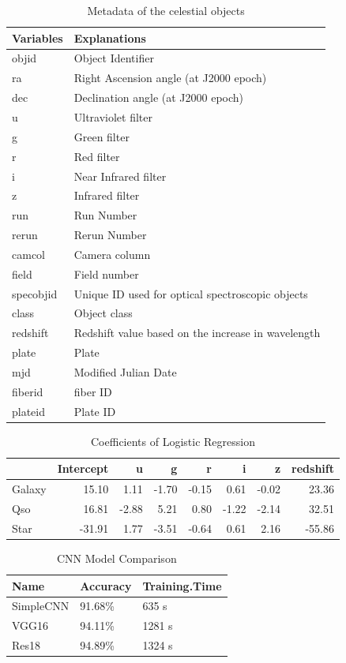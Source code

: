\documentclass[
  11pt,
]{article}
\begin{document}
\begin{table}[H]
\centering
\caption{Metadata of the celestial objects}
\label{tab:metadata}
\centering
\begin{tabular}[t]{ll}
\toprule
Variables & Explanations\\
\midrule
objid & Object Identifier\\
ra & Right Ascension angle (at J2000 epoch)\\
dec & Declination angle (at J2000 epoch)\\
u & Ultraviolet filter\\
g & Green filter\\
\addlinespace
r & Red filter\\
i & Near Infrared filter\\
z & Infrared filter\\
run & Run Number\\
rerun & Rerun Number\\
\addlinespace
camcol & Camera column\\
field & Field number\\
specobjid & Unique ID used for optical spectroscopic objects\\
class & Object class\\
redshift & Redshift value based on the increase in wavelength\\
\addlinespace
plate & Plate\\
mjd & Modified Julian Date\\
fiberid & fiber ID\\
plateid & Plate ID\\
\bottomrule
\end{tabular}
\end{table}

\begin{table}[H]
\centering
\caption{Coefficients of Logistic Regression}
\label{tab:lr}
\centering
\begin{tabular}[t]{lrrrrrrr}
\toprule
  & Intercept & u & g & r & i & z & redshift\\
\midrule
Galaxy & 15.10 & 1.11 & -1.70 & -0.15 & 0.61 & -0.02 & 23.36\\
Qso & 16.81 & -2.88 & 5.21 & 0.80 & -1.22 & -2.14 & 32.51\\
Star & -31.91 & 1.77 & -3.51 & -0.64 & 0.61 & 2.16 & -55.86\\
\bottomrule
\end{tabular}
\end{table}

\begin{table}[H]
\centering
\caption{CNN Model Comparison}
\label{tab:cnn-comp}
\centering
\begin{tabular}[t]{lll}
\toprule
Name & Accuracy & Training.Time\\
\midrule
SimpleCNN & 91.68\% & 635 s\\
VGG16 & 94.11\% & 1281 s\\
Res18 & 94.89\% & 1324 s\\
\bottomrule
\end{tabular}
\end{table}
\end{document}
